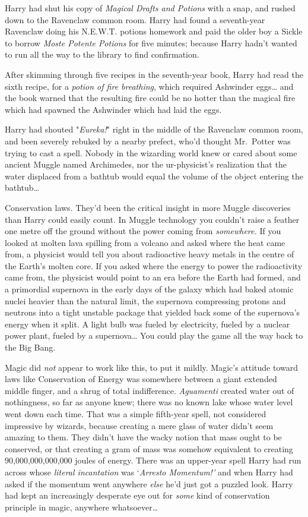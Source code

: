 Harry had shut his copy of \emph{Magical Drafts and Potions} with a snap, and
rushed down to the Ravenclaw common room. Harry had found a seventh-year
Ravenclaw doing his N.E.W.T. potions homework and paid the older boy a Sickle
to borrow \emph{Moste Potente Potions} for five minutes; because Harry hadn't
wanted to run all the way to the library to find confirmation.

After skimming through five recipes in the seventh-year book, Harry had read
the sixth recipe, for a \emph{potion of fire breathing}, which required
Ashwinder eggs{\ldots} and the book warned that the resulting fire could be no
hotter than the magical fire which had spawned the Ashwinder which had laid the
eggs.

Harry had shouted "\emph{Eureka!}" right in the middle of the Ravenclaw common
room, and been severely rebuked by a nearby prefect, who'd thought Mr.~Potter
was trying to cast a spell. Nobody in the wizarding world knew or cared about
some ancient Muggle named Archimedes, nor the ur-physicist's realization that
the water displaced from a bathtub would equal the volume of the object
entering the bathtub{\ldots}

Conservation laws. They'd been the critical insight in more Muggle discoveries
than Harry could easily count. In Muggle technology you couldn't raise a
feather one metre off the ground without the power coming from
\emph{somewhere.} If you looked at molten lava spilling from a volcano and
asked where the heat came from, a physicist would tell you about radioactive
heavy metals in the centre of the Earth's molten core. If you asked where the
energy to power the radioactivity came from, the physicist would point to an
era before the Earth had formed, and a primordial supernova in the early days
of the galaxy which had baked atomic nuclei heavier than the natural limit, the
supernova compressing protons and neutrons into a tight unstable package that
yielded back some of the supernova's energy when it split. A light bulb was
fueled by electricity, fueled by a nuclear power plant, fueled by a
supernova{\ldots} You could play the game all the way back to the Big Bang.

Magic did \emph{not} appear to work like this, to put it mildly. Magic's
attitude toward laws like Conservation of Energy was somewhere between a giant
extended middle finger, and a shrug of total indifference. \emph{Aguamenti}
created water out of nothingness, so far as anyone knew; there was no known
lake whose water level went down each time. That was a simple fifth-year spell,
not considered impressive by wizards, because creating a mere glass of water
didn't seem amazing to them. They didn't have the wacky notion that mass ought
to be conserved, or that creating a gram of mass was somehow equivalent to
creating 90,000,000,000,000 joules of energy. There was an upper-year spell
Harry had run across whose \emph{literal incantation} was `\emph{Arresto
Momentum!'} and when Harry had asked if the momentum went anywhere \emph{else}
he'd just got a puzzled look. Harry had kept an increasingly desperate eye
out for \emph{some} kind of conservation principle in magic, anywhere
whatsoever{\ldots}

